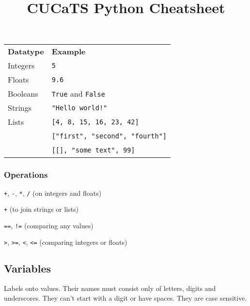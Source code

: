 \documentclass[12pt,twocolumn]{article}
\title{CUCaTS Python Cheatsheet}
\date{}
\begin{document}
	\maketitle
	
	\subsubsection*{}
	
	\begin{tabular}{l l}
		\textbf{Datatype} & \textbf{Example} \\

		Integers &
		\colorbox{codebg}{\lstinline|5|} \\
		
		Floats &
		\colorbox{codebg}{\lstinline|9.6|} \\
		
		Booleans &
		\colorbox{codebg}{\lstinline|True|} and \colorbox{codebg}{\lstinline|False|} \\
		
		Strings &
		\colorbox{codebg}{\lstinline|"Hello world!"|} \\
		
		Lists &
		\colorbox{codebg}{\lstinline|[4, 8, 15, 16, 23, 42]|} \\
		\, &
		\colorbox{codebg}{\lstinline|["first", "second", "fourth"]|} \\
		\, &
		\colorbox{codebg}{\lstinline|[[], "some text", 99]|}
	\end{tabular}
	
	\subsubsection*{Operations}
	
	\lstinline|+|, \lstinline|-|, \lstinline|*|, \lstinline|/| (on integers and floats)
	
	\lstinline|+| (to join strings or lists)
	
	\lstinline|==|, \lstinline|!=| (comparing any values)
	
	\lstinline|>|, \lstinline|>=|, \lstinline|<|, \lstinline|<=| (comparing integers or floats)
	
	\subsection*{Variables}
	
	Labels onto values. Their names must consist only of letters, digits and underscores. They can't start with a digit or have spaces. They are case sensitive.
	
\end{document}

